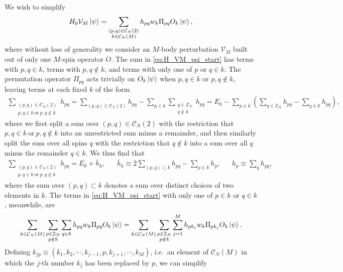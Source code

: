 \documentclass[nofootinbib,notitlepage,11pt]{revtex4-2}
\renewcommand{\t}{\text} %
\newcommand{\p}[1]{\left(#1\right)} %
\newcommand{\1}{\mathds{1}}
\newcommand{\C}{\mathcal{C}}
\newcommand{\V}{\mathcal{V}}
\newcommand{\ZZ}{\mathbb{Z}}
\begin{document}
We wish to simplify
\begin{align}
  H_0 \V_M \ket\psi
  = \sum_{\substack{\p{p,q}\in\C_N\p{2}\\k\in\C_N\p{M}}} h_{pq} w_k
  \Pi_{pq} O_k \ket\psi,
  \label{eq:H_VM_psi_start}
\end{align}
where without loss of generality we consider an $M$-body perturbation
$\V_M$ built out of only one $M$-spin operator $O$.  The sum in
\eqref{eq:H_VM_psi_start} has terms with $p,q\in k$, terms with
$p,q\notin k$, and terms with only one of $p$ or $q\in k$.  The
permutation operator $\Pi_{pq}$ acts trivially on $O_k\ket\psi$ when
$p,q\in k$ or $p,q\notin k$, leaving terms at each fixed $k$ of the
form
\begin{align}
  \sum_{\substack{\p{p,q}\in\C_N\p{2}\\p,q\in k~\t{or}~p,q\notin k}} h_{pq}
  = \sum_{\p{p,q}\in\C_N\p{2}} h_{pq}
  - \sum_{p\in k} \sum_{\substack{q\in\ZZ_N\\q\notin k}} h_{pq}
  = E_0 - \sum_{p\in k}
  \p{\sum_{q\in\ZZ_N} h_{pq} - \sum_{q\in k} h_{pq}},
\end{align}
where we first split a sum over $\p{p,q}\in\C_N\p{2}$ with the
restriction that $p,q\in k~\t{or}~p,q\notin k$ into an unrestricted
sum minus a remainder, and then similarly split the sum over all spins
$q$ with the restriction that $q\notin k$ into a sum over all $q$
minus the remainder $q\in k$.  We thus find that
\begin{align}
  \sum_{\substack{\p{p,q}\in\C_N\p{2}\\p,q\in k~\t{or}~p,q\notin k}} h_{pq}
  = E_0 + \bar h_k,
  &&
  \bar h_k \equiv 2\sum_{\p{p,q}\subset k} h_{pq} - \sum_{p\in k} h_p,
  &&
  h_p \equiv \sum_q h_{pq},
\end{align}
where the sum over $\p{p,q}\subset k$ denotes a sum over distinct
choices of two elements in $k$.  The terms in
\eqref{eq:H_VM_psi_start} with only one of $p\in k$ or $q\in k$,
meanwhile, are
\begin{align}
  \sum_{k\in\C_N\p{M}} \sum_{\substack{p\in\ZZ_N\\p\notin k}} \sum_{q\in k}
  h_{pq} w_k \Pi_{pq} O_k \ket\psi
  = \sum_{k\in\C_N\p{M}} \sum_{\substack{p\in\ZZ_N\\p\notin k}}
  \sum_{j=1}^M h_{p k_j} w_k \Pi_{p k_j} O_k \ket\psi.
\end{align}
Defining
$k_{jp}\equiv\p{k_1,k_2,\cdots,k_{j-1},p,k_{j+1},\cdots,k_M}$, i.e.~an
element of $\C_N\p{M}$ in which the $j$-th number $k_j$ has been
replaced by $p$, we can simplify
\end{document}

